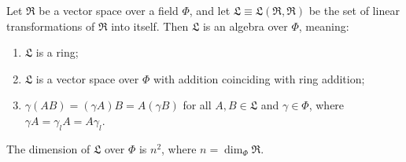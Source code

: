 Let $\mathfrak{R}$ be a vector space over a field $\Phi$, and let $\mathfrak{L} \equiv \mathfrak{L}(\mathfrak{R}, \mathfrak{R})$ be the set of linear transformations of $\mathfrak{R}$ into itself. Then $\mathfrak{L}$ is an algebra over $\Phi$, meaning:

\begin{enumerate}
\item $\mathfrak{L}$ is a ring;
\item $\mathfrak{L}$ is a vector space over $\Phi$ with addition coinciding with ring addition;
\item $\gamma(AB) = (\gamma A)B = A(\gamma B)$ for all $A, B \in \mathfrak{L}$ and $\gamma \in \Phi$, where $\gamma A = \gamma_l A = A \gamma_l$.
\end{enumerate}

The dimension of $\mathfrak{L}$ over $\Phi$ is $n^2$, where $n = \dim_\Phi \mathfrak{R}$.

